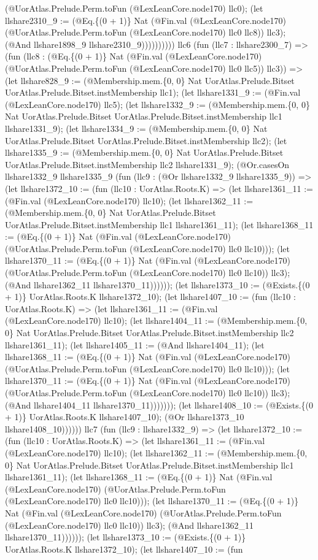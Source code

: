 \documentclass[11pt]{article}
\begin{document}
(@UorAtlas.Prelude.Perm.toFun (@LexLeanCore.node170) llc0); (let llshare2310\_9 := (@Eq.\{(0 + 1)\} Nat (@Fin.val (@LexLeanCore.node170) (@UorAtlas.Prelude.Perm.toFun (@LexLeanCore.node170) llc0 llc8)) llc3); (@And llshare1898\_9 llshare2310\_9)))))))))) llc6 (fun (llc7 : llshare2300\_7) => (fun (llc8 : (@Eq.\{(0 + 1)\} Nat (@Fin.val (@LexLeanCore.node170) (@UorAtlas.Prelude.Perm.toFun (@LexLeanCore.node170) llc0 llc5)) llc3)) => (let llshare828\_9 := (@Membership.mem.\{0, 0\} Nat UorAtlas.Prelude.Bitset UorAtlas.Prelude.Bitset.instMembership llc1); (let llshare1331\_9 := (@Fin.val (@LexLeanCore.node170) llc5); (let llshare1332\_9 := (@Membership.mem.\{0, 0\} Nat UorAtlas.Prelude.Bitset UorAtlas.Prelude.Bitset.instMembership llc1 llshare1331\_9); (let llshare1334\_9 := (@Membership.mem.\{0, 0\} Nat UorAtlas.Prelude.Bitset UorAtlas.Prelude.Bitset.instMembership llc2); (let llshare1335\_9 := (@Membership.mem.\{0, 0\} Nat UorAtlas.Prelude.Bitset UorAtlas.Prelude.Bitset.instMembership llc2 llshare1331\_9); (@Or.casesOn llshare1332\_9 llshare1335\_9 (fun (llc9 : (@Or llshare1332\_9 llshare1335\_9)) => (let llshare1372\_10 := (fun (llc10 : UorAtlas.Roots.K) => (let llshare1361\_11 := (@Fin.val (@LexLeanCore.node170) llc10); (let llshare1362\_11 := (@Membership.mem.\{0, 0\} Nat UorAtlas.Prelude.Bitset UorAtlas.Prelude.Bitset.instMembership llc1 llshare1361\_11); (let llshare1368\_11 := (@Eq.\{(0 + 1)\} Nat (@Fin.val (@LexLeanCore.node170) (@UorAtlas.Prelude.Perm.toFun (@LexLeanCore.node170) llc0 llc10))); (let llshare1370\_11 := (@Eq.\{(0 + 1)\} Nat (@Fin.val (@LexLeanCore.node170) (@UorAtlas.Prelude.Perm.toFun (@LexLeanCore.node170) llc0 llc10)) llc3); (@And llshare1362\_11 llshare1370\_11)))))); (let llshare1373\_10 := (@Exists.\{(0 + 1)\} UorAtlas.Roots.K llshare1372\_10); (let llshare1407\_10 := (fun (llc10 : UorAtlas.Roots.K) => (let llshare1361\_11 := (@Fin.val (@LexLeanCore.node170) llc10); (let llshare1404\_11 := (@Membership.mem.\{0, 0\} Nat UorAtlas.Prelude.Bitset UorAtlas.Prelude.Bitset.instMembership llc2 llshare1361\_11); (let llshare1405\_11 := (@And llshare1404\_11); (let llshare1368\_11 := (@Eq.\{(0 + 1)\} Nat (@Fin.val (@LexLeanCore.node170) (@UorAtlas.Prelude.Perm.toFun (@LexLeanCore.node170) llc0 llc10))); (let llshare1370\_11 := (@Eq.\{(0 + 1)\} Nat (@Fin.val (@LexLeanCore.node170) (@UorAtlas.Prelude.Perm.toFun (@LexLeanCore.node170) llc0 llc10)) llc3); (@And llshare1404\_11 llshare1370\_11))))))); (let llshare1408\_10 := (@Exists.\{(0 + 1)\} UorAtlas.Roots.K llshare1407\_10); (@Or llshare1373\_10 llshare1408\_10)))))) llc7 (fun (llc9 : llshare1332\_9) => (let llshare1372\_10 := (fun (llc10 : UorAtlas.Roots.K) => (let llshare1361\_11 := (@Fin.val (@LexLeanCore.node170) llc10); (let llshare1362\_11 := (@Membership.mem.\{0, 0\} Nat UorAtlas.Prelude.Bitset UorAtlas.Prelude.Bitset.instMembership llc1 llshare1361\_11); (let llshare1368\_11 := (@Eq.\{(0 + 1)\} Nat (@Fin.val (@LexLeanCore.node170) (@UorAtlas.Prelude.Perm.toFun (@LexLeanCore.node170) llc0 llc10))); (let llshare1370\_11 := (@Eq.\{(0 + 1)\} Nat (@Fin.val (@LexLeanCore.node170) (@UorAtlas.Prelude.Perm.toFun (@LexLeanCore.node170) llc0 llc10)) llc3); (@And llshare1362\_11 llshare1370\_11)))))); (let llshare1373\_10 := (@Exists.\{(0 + 1)\} UorAtlas.Roots.K llshare1372\_10); (let llshare1407\_10 := (fun 
\end{document}
